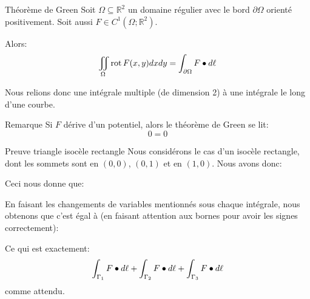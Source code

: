 \documentclass[a4paper]{article}
\begin{document}
\begin{parag}{Théorème de Green}
    Soit $\Omega \subseteq \mathbb{R}^2$ un domaine régulier avec le bord $\partial \Omega$ orienté positivement. Soit aussi $F \in C^1\left(\Omega; \mathbb{R}^2\right)$.

    Alors: 
    \[\iint_{\Omega} \rot F\left(x, y\right) dxdy = \int_{\partial\Omega} F \dotprod d \ell \]
    
    Nous relions donc une intégrale multiple (de dimension 2) à une intégrale le long d'une courbe. 

    \begin{subparag}{Remarque}
        Si $F$ dérive d'un potentiel, alors le théorème de Green se lit: 
        \[0 = 0\]
    \end{subparag}

    \begin{subparag}{Preuve triangle isocèle rectangle}
        Nous considérons le cas d'un isocèle rectangle, dont les sommets sont en $\left(0, 0\right)$, $\left(0, 1\right)$ et en $\left(1, 0\right)$.
        Nous avons donc: 
        
        Ceci nous donne que: 


        En faisant les changements de variables mentionnés sous chaque intégrale, nous obtenons que c'est égal à (en faisant attention aux bornes pour avoir les signes correctement):

        Ce qui est exactement:
        \[\int_{\Gamma_1} F \bullet d \ell + \int_{\Gamma_2} F \bullet d \ell + \int_{\Gamma_3} F \bullet d \ell\]
        comme attendu.
    \end{subparag}


\end{parag}
\end{document}
